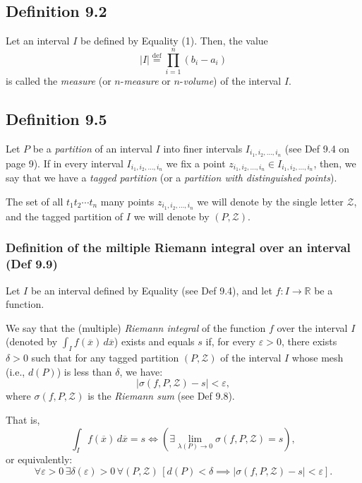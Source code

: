\vspace{1em}

\subsection*{Definition 9.2}
Let an interval $I$ be defined by Equality (1).
Then, the value
\[
    |I| \overset{\text{def}}{=} \prod_{i=1}^n (b_i - a_i)
\]
is called the \textit{measure} (or $n$-\textit{measure} or $n$-\textit{volume}) of the interval $I$.

\vspace{1em}

\subsection*{Definition 9.5}
Let $P$ be a \textit{partition} of an interval $I$ into finer intervals $I_{i_1, i_2, \dots, i_n}$ (see Def 9.4 on page 9).
If in every interval $I_{i_1, i_2, \dots, i_n}$ we fix a point $z_{i_1, i_2, \dots, i_n} \in I_{i_1, i_2, \dots, i_n}$, then, we say that we have a \textit{tagged partition} (or a \textit{partition with distinguished points}).

The set of all $t_1 t_2 \cdots t_n$ many points $z_{i_1, i_2, \dots, i_n}$ we will denote by the single letter $\mathcal{Z}$, and the tagged partition of $I$ we will denote by $(P, \mathcal{Z})$.

\subsubsection{Definition of the miltiple Riemann integral over an interval (Def 9.9)}

Let $I$ be an interval defined by Equality (see Def 9.4), and let $f: I \to \mathbb{R}$ be a function.

We say that the (multiple) \textit{Riemann integral} of the function $f$ over the interval $I$ (denoted by \(\int_I f(\overline{x}) \, d\overline{x}\)) exists and equals $s$ if, for every $\varepsilon > 0$, there exists $\delta > 0$ such that for any tagged partition $(P, \mathcal{Z})$ of the interval $I$ whose mesh (i.e., \(d(P)\)) is less than $\delta$, we have:
\[
    |\sigma(f, P, \mathcal{Z}) - s| < \varepsilon,
\]
where \(\sigma(f, P, \mathcal{Z})\) is the \textit{Riemann sum} (see Def 9.8).

That is,
\[
    \int_I f(\overline{x}) \, d\overline{x} = s \iff
    \left(\exists \lim_{\lambda(P) \to 0} \sigma(f, P, \mathcal{Z}) = s \right),
\]
or equivalently:
\[
    \forall \varepsilon > 0 \, \exists \delta(\varepsilon) > 0 \, \forall (P, \mathcal{Z}) \,
    \left[ d(P) < \delta \implies |\sigma(f, P, \mathcal{Z}) - s| < \varepsilon \right].
\]

